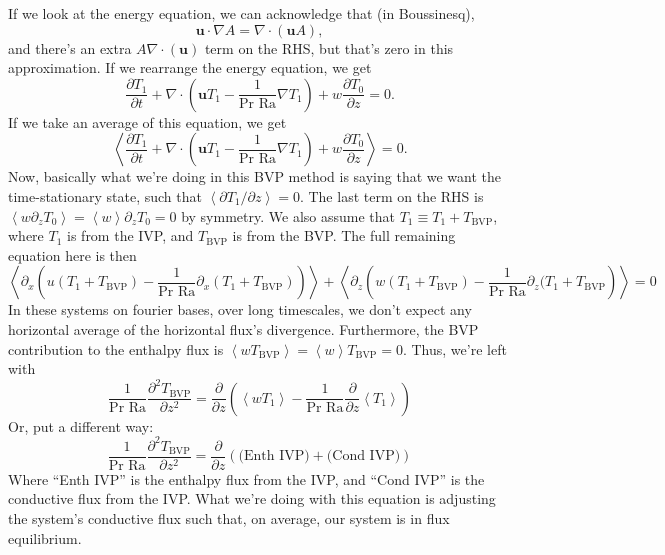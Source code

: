 \documentclass[aps, pre, onecolumn, nofootinbib, notitlepage, groupedaddress, amsfonts, amssymb, amsmath, longbibliography]{revtex4-1}
\newcommand{\Div}[1]{\ensuremath{\nabla\cdot\left( #1\right)}}
\newcommand{\angles}[1]{\ensuremath{\left\langle #1 \right\rangle}}
\newcommand{\grad}{\ensuremath{\nabla}}
\begin{document}
If we look at the energy equation, we can acknowledge that (in Boussinesq),
$$
\bm{u}\cdot\grad A = \Div{\bm{u}A},
$$
and there's an extra $A\Div{\bm{u}}$ term on the RHS, but that's zero in this
approximation.  If we rearrange the energy equation, we get
$$
\frac{\partial T_1}{\partial t} + \Div{\bm{u} T_1 - \frac{1}{\text{Pr Ra}} \grad T_1} + w\frac{\partial T_0}{\partial z} = 0.
$$
If we take an average of this equation, we get
$$
\angles{\frac{\partial T_1}{\partial t} + \Div{\bm{u} T_1 - \frac{1}{\text{Pr Ra}} \grad T_1} + w\frac{\partial T_0}{\partial z}} = 0.
$$
Now, basically what we're doing in this BVP method is saying that we want the time-stationary state, such that $\angles{\partial T_1/\partial z} = 0$.
The last term on the RHS is $\angles{ w \partial_z T_0} = \angles{w}\partial_z T_0 = 0$ by symmetry.
We also assume that $T_1 \equiv T_1 + T_{\text{BVP}}$, where $T_1$ is from the IVP,
and $T_{\text{BVP}}$ is from the BVP.
The full remaining equation here is then
$$
\angles{\partial_x \left( u (T_1 + T_{\text{BVP}}) - \frac{1}{\text{Pr Ra}} \partial_x (T_1 + T_{\text{BVP}}) \right)}
+ \angles{\partial_z \left( w (T_1 + T_{\text{BVP}}) - \frac{1}{\text{Pr Ra}} \partial_z (T_1 + T_{\text{BVP}} \right)} = 0
$$
In these systems on fourier bases, over long timescales, we don't expect any horizontal average of the
horizontal flux's divergence.  Furthermore, the BVP contribution to the enthalpy flux
is $\angles{w T_{\text{BVP}}} = \angles{w} T_{\text{BVP}} = 0$.  Thus, we're left with
\begin{equation}
\frac{1}{\text{Pr Ra}}\frac{\partial^2 T_{\text{BVP}}}{\partial z^2} = 
\frac{\partial}{\partial z}\left( \angles{w T_1} - \frac{1}{\text{Pr Ra}} 
\frac{\partial}{\partial z}\angles{T_1}\right)
\end{equation}
Or, put a different way:
\begin{equation}
\frac{1}{\text{Pr Ra}}\frac{\partial^2 T_{\text{BVP}}}{\partial z^2} = 
\frac{\partial}{\partial z}\left( \text{(Enth IVP)} + \text{(Cond IVP)}\right)
\end{equation}
Where ``Enth IVP'' is the enthalpy flux from the IVP, and ``Cond IVP'' is the conductive
flux from the IVP.  What we're doing with this equation is adjusting the system's
conductive flux such that, on average, our system is in flux equilibrium.
\end{document}
